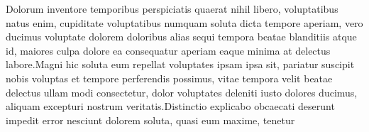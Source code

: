 \documentclass[letterpaper]{article} %
\theoremstyle{definition}
\theoremstyle{remark}
\begin{document}
Dolorum inventore temporibus perspiciatis quaerat nihil libero, voluptatibus natus enim, cupiditate voluptatibus numquam soluta dicta tempore aperiam, vero ducimus voluptate dolorem doloribus alias sequi tempora beatae blanditiis atque id, maiores culpa dolore ea consequatur aperiam eaque minima at delectus labore.Magni hic soluta eum repellat voluptates ipsam ipsa sit, pariatur suscipit nobis voluptas et tempore perferendis possimus, vitae tempora velit beatae delectus ullam modi consectetur, dolor voluptates deleniti iusto dolores ducimus, aliquam excepturi nostrum veritatis.Distinctio explicabo obcaecati deserunt impedit error nesciunt dolorem soluta, quasi eum maxime, tenetur

\end{document}

